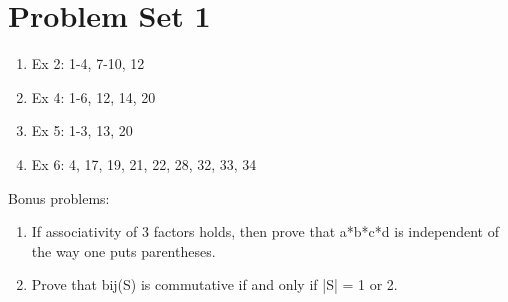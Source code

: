 \pagebreak
\section*{Problem Set 1}
\hypertarget{ModernAlgebra-Assignment01}{}

\begin{enumerate}
    \item{Ex 2: 1-4, 7-10, 12}
    \item{Ex 4: 1-6, 12, 14, 20}
    \item{Ex 5: 1-3, 13, 20}
    \item{Ex 6: 4, 17, 19, 21, 22, 28, 32, 33, 34}
\end{enumerate}

Bonus problems:
\begin{enumerate}
    \item{If associativity of 3 factors holds, then prove that a*b*c*d is independent of the way one puts parentheses.}
    \item{Prove that bij(S) is commutative if and only if |S| = 1 or 2.}
\end{enumerate}



